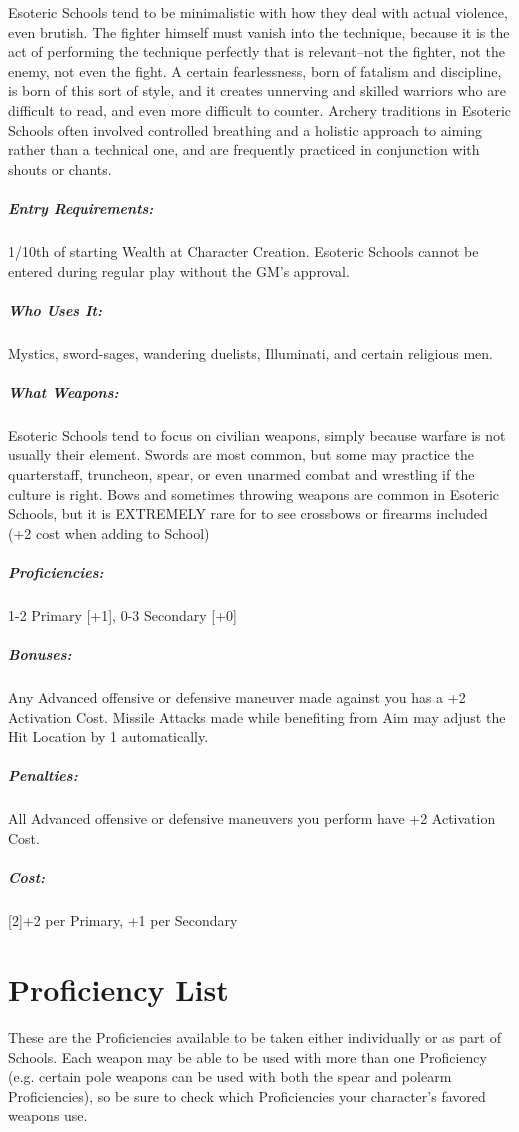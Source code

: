 \documentclass[oneside,11pt,english]{book}
\begin{document}
Esoteric Schools tend to be minimalistic with how they deal with actual violence, even brutish. The 
fighter himself must vanish into the technique, because it is the act of performing the technique perfectly 
that is relevant--not the fighter, not the enemy, not even the fight. A certain fearlessness, born of fatalism 
and discipline, is born of this sort of style, and it creates unnerving and skilled warriors who are difficult 
to read, and even more difficult to counter. Archery traditions in Esoteric Schools often involved 
controlled breathing and a holistic approach to aiming rather than a technical one, and are frequently 
practiced in conjunction with shouts or chants. 
\vspace{-15pt}\subparagraph{Entry Requirements:} 1/10th of starting Wealth at Character Creation. Esoteric Schools cannot be entered during regular play without the GM’s approval.
\vspace{-15pt}\subparagraph{Who Uses It:} Mystics, sword-sages, wandering duelists, Illuminati, and certain religious men. 
\vspace{-15pt}\subparagraph{What Weapons:} Esoteric Schools tend to focus on civilian weapons, simply because warfare is not 
usually their element. Swords are most common, but some may practice the quarterstaff, truncheon, spear, or even unarmed combat and wrestling if the culture is right. Bows and sometimes throwing weapons are 
common in Esoteric Schools, but it is EXTREMELY rare for to see crossbows or firearms included (+2 
cost when adding to School) 
\vspace{-15pt}\subparagraph{Proficiencies:} 1-2 Primary [+1], 0-3 Secondary [+0] 
\vspace{-15pt}\subparagraph{Bonuses:} Any Advanced offensive or defensive maneuver made against you has a +2 Activation Cost. 
Missile Attacks made while benefiting from Aim may adjust the Hit Location by 1 automatically. 
\vspace{-15pt}\subparagraph{Penalties:} All Advanced offensive or defensive maneuvers you perform have +2 Activation Cost. 
\vspace{-15pt}\subparagraph{Cost:} [2]+2 per Primary, +1 per Secondary 

\section*{Proficiency List}
These are the Proficiencies available to be taken either individually or as part of Schools. Each weapon 
may be able to be used with more than one Proficiency (e.g. certain pole weapons can be used with both 
the spear and polearm Proficiencies), so be sure to check which Proficiencies your character’s favored weapons use.
\end{document}
